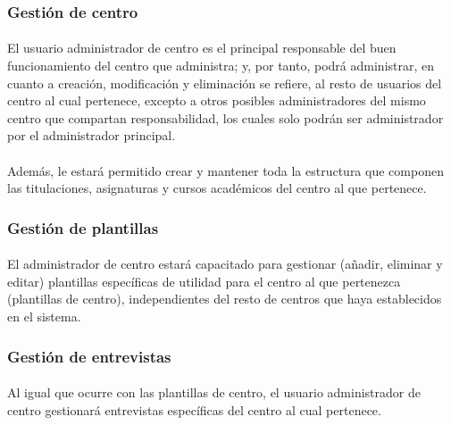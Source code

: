       \subsubsection{Gestión de centro}

      \paragraph{}El usuario administrador de centro es el principal responsable
      del buen funcionamiento del centro que administra; y, por tanto, podrá
      administrar, en cuanto a creación, modificación y eliminación se refiere,
      al resto de usuarios del centro al cual pertenece, excepto a otros
      posibles administradores del mismo centro que compartan responsabilidad,
      los cuales solo podrán ser administrador por el administrador principal.

      \paragraph{}Además, le estará permitido crear y mantener toda la
      estructura que componen las titulaciones, asignaturas y cursos
      académicos del centro al que pertenece.

      \subsubsection{Gestión de plantillas}

      \paragraph{}El administrador de centro estará capacitado para gestionar
      (añadir, eliminar y editar) plantillas específicas de utilidad para el
      centro al que pertenezca (plantillas de centro), independientes del resto
      de centros que haya establecidos en el sistema.

      \subsubsection{Gestión de entrevistas}

      \paragraph{}Al igual que ocurre con las plantillas de centro, el usuario
      administrador de centro gestionará entrevistas específicas del centro
      al cual pertenece.

